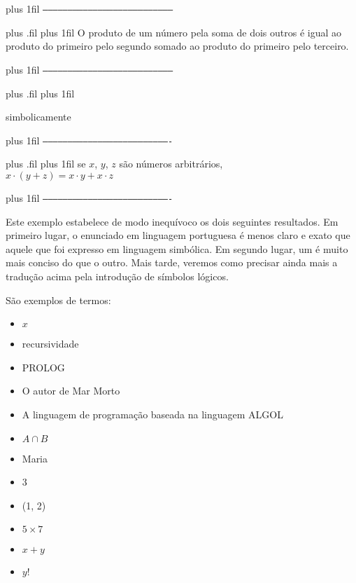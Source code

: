 \documentclass[
	14pt,				%
	twoside,			%
	a4paper,			%
	english,			%
	french,				%
	spanish,			%
	brazil,				%
    ]{abntex2}
\begin{document}
\vskip 1cm

\begingroup
\leftskip=3cm \rightskip=3cm
\parfillskip=0.5cm plus 1fil
\noindent\texttt{-----------------------------------------------------------------------------}

\leftskip=3.3cm plus .fil \rightskip=3.3cm
\parfillskip=0.5cm plus 1fil
\noindent O produto de um número pela soma de dois outros é igual ao produto do primeiro pelo segundo somado ao produto do primeiro pelo terceiro.

\leftskip=3cm \rightskip=3cm
\parfillskip=0.5cm plus 1fil
\noindent\texttt{-----------------------------------------------------------------------------}\par

\leftskip=3.3cm plus .fil \rightskip=3.3cm
\parfillskip=0.5cm plus 1fil

\centering simbolicamente

\leftskip=3cm \rightskip=3cm
\parfillskip=0.5cm plus 1fil
\noindent\texttt{----------------------------------------------------------------------------}

\leftskip=3.6cm plus .fil \rightskip=3cm
\parfillskip=0.5cm plus 1fil
\noindent \centering se $x$, $y$, $z$ são números arbitrários,\\
$x \cdot (y + z) = x \cdot y + x \cdot z$

\leftskip=3cm \rightskip=3cm
\parfillskip=0.5cm plus 1fil
\noindent\texttt{----------------------------------------------------------------------------}\par

\endgroup

\newpage

Este exemplo estabelece de modo inequívoco os dois seguintes resultados. Em primeiro lugar, o enunciado em linguagem portuguesa é menos claro e exato que aquele que foi expresso em linguagem simbólica.
Em segundo lugar, um é muito mais conciso do que o outro.
Mais tarde, veremos como precisar ainda mais a tradução acima pela introdução de símbolos lógicos.

\newpage

\noindent São exemplos de termos:

\begin{itemize}[itemsep=0.01pt]
\renewcommand\labelitemi{\textbf{-}}
    \item $x$
    \item recursividade
    \item PROLOG
    \item  O autor de Mar Morto
    \item  A linguagem de programação baseada na linguagem ALGOL
    \item $A \cap B$
    \item Maria
    \item 3
    \item (1, 2)
    \item $5 \times 7$
    \item $x + y$
    \item $y!$

\end{itemize}
\end{document}
